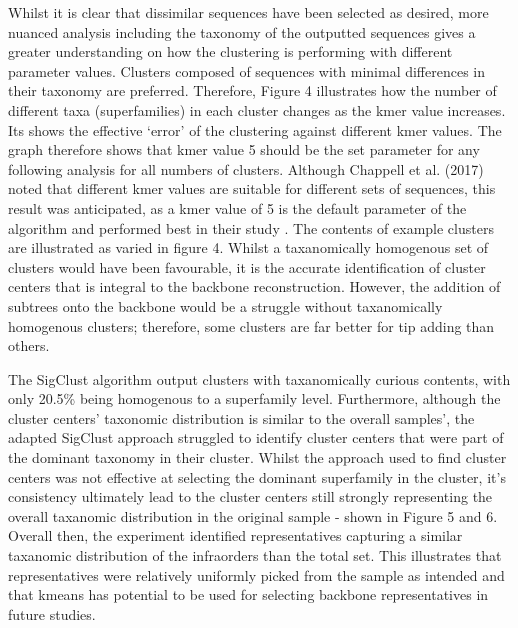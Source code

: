 \documentclass[12pt]{article}
\begin{document}
  Whilst it is clear that dissimilar sequences have been selected as desired, more nuanced analysis including the taxonomy of the outputted sequences gives a greater understanding on how the clustering is performing with different parameter values. Clusters composed of sequences with minimal differences in their taxonomy are preferred. Therefore, Figure 4 illustrates how the number of different taxa (superfamilies) in each cluster changes as the kmer value increases. Its shows the effective `error' of the clustering against different kmer values. The graph therefore shows that kmer value 5 should be the set parameter for any following analysis for all numbers of clusters. Although Chappell et al. (2017) noted that different kmer values are suitable for different sets of sequences, this result was anticipated, as a kmer value of 5 is the default parameter of the algorithm and performed best in their study \cite{Chappell2017}. The contents of example clusters are illustrated as varied in figure 4. Whilst a taxanomically homogenous set of clusters would have been favourable, it is the accurate identification of cluster centers that is integral to the backbone reconstruction. However, the addition of subtrees onto the backbone would be a struggle without taxanomically homogenous clusters; therefore, some clusters are far better for tip adding than others. 

  The SigClust algorithm output clusters with taxanomically curious contents, with only 20.5\% being homogenous to a superfamily level. Furthermore, although the cluster centers' taxonomic distribution is similar to the overall samples', the adapted SigClust approach struggled to identify cluster centers that were part of the dominant taxonomy in their cluster. Whilst the approach used to find cluster centers was not effective at selecting the dominant superfamily in the cluster, it's consistency ultimately lead to the cluster centers still strongly representing the overall taxanomic distribution in the original sample - shown in Figure 5 and 6. Overall then, the experiment identified representatives capturing a similar taxanomic distribution of the infraorders than the total set. This illustrates that representatives were relatively uniformly picked from the sample as intended and that kmeans has potential to be used for selecting backbone representatives in future studies.
\end{document}
